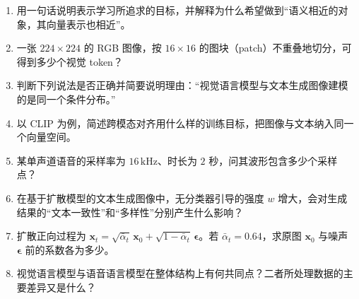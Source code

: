\begin{exercisebox}
  \begin{enumerate}
    \item 用一句话说明表示学习所追求的目标，并解释为什么希望做到“语义相近的对象，其向量表示也相近”。
    \item 一张 $224\times224$ 的 RGB 图像，按 $16\times16$ 的图块（patch）不重叠地切分，可得到多少个视觉 token？
    \item 判断下列说法是否正确并简要说明理由：“视觉语言模型与文本生成图像建模的是同一个条件分布。”
    \item 以 CLIP 为例，简述跨模态对齐用什么样的训练目标，把图像与文本纳入同一个向量空间。
    \item 某单声道语音的采样率为 $16\,\mathrm{kHz}$、时长为 $2$ 秒，问其波形包含多少个采样点？
    \item 在基于扩散模型的文本生成图像中，无分类器引导的强度 $w$ 增大，会对生成结果的“文本一致性”和“多样性”分别产生什么影响？
    \item 扩散正向过程为 $\mathbf{x}_t=\sqrt{\bar\alpha_t}\,\mathbf{x}_0+\sqrt{1-\bar\alpha_t}\,\boldsymbol{\epsilon}$。若 $\bar\alpha_t=0.64$，求原图 $\mathbf{x}_0$ 与噪声 $\boldsymbol{\epsilon}$ 前的系数各为多少。
    \item 视觉语言模型与语音语言模型在整体结构上有何共同点？二者所处理数据的主要差异又是什么？
  \end{enumerate}
\end{exercisebox}

